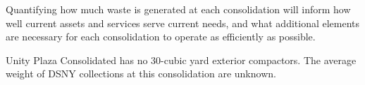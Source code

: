 
    Quantifying how much waste is generated at each consolidation will inform how well current assets and services serve current needs, and what additional elements are necessary for each consolidation to operate as efficiently as possible.
    
    Unity Plaza Consolidated has no 30-cubic yard exterior compactors. The average weight of DSNY collections at this consolidation are unknown.